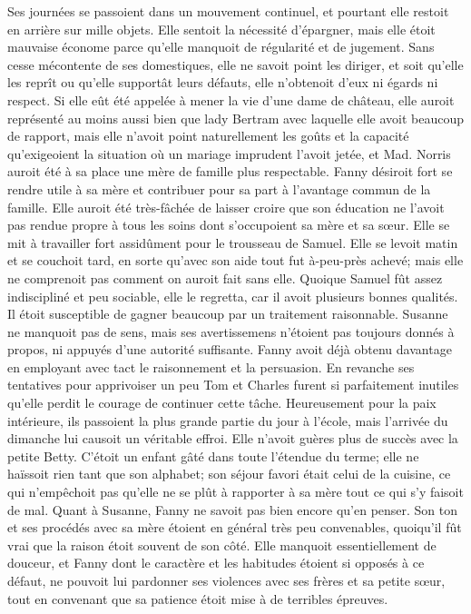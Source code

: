 Ses journées se passoient dans un mouvement continuel, et pourtant elle restoit en arrière sur mille objets. Elle sentoit la nécessité d'épargner, mais elle étoit mauvaise économe parce qu'elle manquoit de régularité et de jugement. Sans cesse mécontente de ses domestiques, elle ne savoit point les diriger, et soit qu'elle les reprît ou qu'elle supportât leurs défauts, elle n'obtenoit d'eux ni égards ni respect. Si elle eût été appelée à mener la vie d'une dame de château, elle auroit représenté au moins aussi bien que lady Bertram avec laquelle elle avoit beaucoup de rapport, mais elle n'avoit point naturellement les goûts et la capacité qu'exigeoient la situation où un mariage imprudent l'avoit jetée, et Mad. Norris auroit été à sa place une mère de famille plus respectable.
Fanny désiroit fort se rendre utile à sa mère et contribuer pour sa part à l'avantage commun de la famille. Elle auroit été très-fâchée de laisser croire que son éducation\setcounter{page}{398} ne l'avoit pas rendue propre à tous les soins dont s'occupoient sa mère et sa sœur. Elle se mit à travailler fort assidûment pour le trousseau de Samuel. Elle se levoit matin et se couchoit tard, en sorte qu'avec son aide tout fut à-peu-près achevé; mais elle ne comprenoit pas comment on auroit fait sans elle.
Quoique Samuel fût assez indiscipliné et peu sociable, elle le regretta, car il avoit plusieurs bonnes qualités. Il étoit susceptible de gagner beaucoup par un traitement raisonnable. Susanne ne manquoit pas de sens, mais ses avertissemens n'étoient pas toujours donnés à propos, ni appuyés d'une autorité suffisante. Fanny avoit déjà obtenu davantage en employant avec tact le raisonnement et la persuasion. En revanche ses tentatives pour apprivoiser un peu Tom et Charles furent si parfaitement inutiles qu'elle perdit le courage de continuer cette tâche. Heureusement pour la paix intérieure, ils passoient la plus grande partie du jour à l'école, mais l'arrivée du dimanche lui causoit un véritable effroi. Elle n'avoit guères plus de succès avec la petite Betty. C'étoit un enfant gâté dans toute l'étendue du terme; elle ne haïssoit rien tant que son alphabet;\setcounter{page}{399} son séjour favori était celui de la cuisine, ce qui n'empêchoit pas qu'elle ne se plût à rapporter à sa mère tout ce qui s'y faisoit de mal.
Quant à Susanne, Fanny ne savoit pas bien encore qu'en penser. Son ton et ses procédés avec sa mère étoient en général très peu convenables, quoiqu'il fût vrai que la raison étoit souvent de son côté. Elle manquoit essentiellement de douceur, et Fanny dont le caractère et les habitudes étoient si opposés à ce défaut, ne pouvoit lui pardonner ses violences avec ses frères et sa petite sœur, tout en convenant que sa patience étoit mise à de terribles épreuves.
